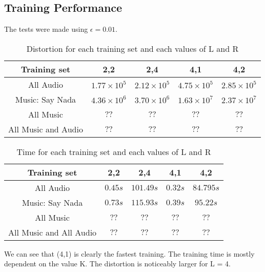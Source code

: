 \documentclass[a4paper, 11pt]{article}
\begin{document}
		\subsection{Training Performance}
		
			The tests were made using $ \epsilon = 0.01 $.
			\begin{table}[H]
				\centering
				\begin{tabular}{c|c|c|c|c}
					\textbf{Training set} & \textbf{2,2} 			& \textbf{2,4}			&  \textbf{4,1}				& \textbf{4,2} \\ \hline
					All Audio 			& $ 1.77 \times 10^{5} $ 	& $ 2.12 \times 10^{5} $& $4.75 \times 10^{5} $ 	& $ 2.85 \times 10^{5} $ \\ \hline
					Music: Say Nada		& $ 4.36 \times 10^{6} $ 	& $ 3.70 \times 10^{6} $& $ 1.63 \times 10^{7} $  	& $ 2.37 \times 10^{7} $ \\ \hline	
					All Music 			& $ ?? $					& $	?? $				& $ ?? $					& $	?? $ \\ \hline
					All Music and Audio & $ ?? $					& $	?? $				& $ ?? $					& $	?? $ \\
				\end{tabular}
				\caption{Distortion for each training set and each values of L and R}
				\label{table:TrainDist}
			\end{table}
			
			\begin{table}[H]
				\centering
				\begin{tabular}{c|c|c|c|c}
					\textbf{Training set}	 	& \textbf{2,2} & \textbf{2,4}	& \textbf{4,1} & \textbf{4,2}\\ \hline
					All Audio 					& $ 0.45 s $ 	& $ 101.49 s $	& $ 0.32 s $ 	& $ 84.79 5 s $	\\ \hline
					Music: Say Nada				& $ 0.73 s $	& $ 115.93 s $	& $ 0.39 s $ 	& $ 95.22 s $	\\ \hline	
					All Music					& $ ?? $		& $	?? $		& $ ?? $		& $	?? $		\\ \hline
					All Music and All Audio 	& $ ?? $		& $	?? $		& $ ?? $		& $	?? $		\\
				\end{tabular}
				\caption{Time for each training set and each values of L and R}
				\label{table:TrainTime}
			\end{table}
		
			We can see that (4,1) is clearly the fastest training.
			The training time is mostly dependent on the value K.
			The distortion is noticeably larger for L = 4.
			
\end{document}
